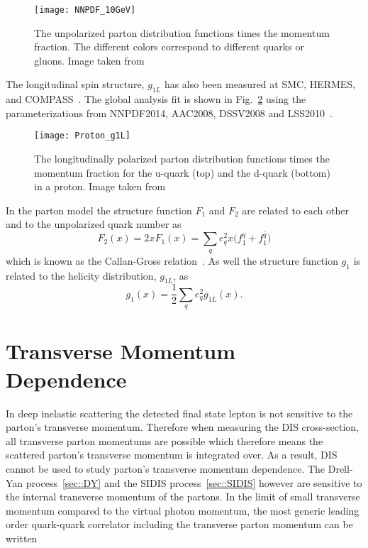 \begin{figure}[h!t]
  \centering \texttt{[image: NNPDF\_10GeV]}
  \caption{The unpolarized parton distribution functions times the momentum
    fraction.  The different colors correspond to different quarks or gluons.
    Image taken from~\cite{Tanabashi:2018oca}}
  \label{fig::NNPDF_10GeV}
\end{figure}

The longitudinal spin structure, $g_{1L}$ has also been measured at SMC, HERMES,
and COMPASS~\cite{Adeva:1997is,PhysRevLett.92.012005,Savin:2011zz}.  The global
analysis fit is shown in Fig.~\ref{fig::Proton_g1L} using the parameterizations
from NNPDF2014, AAC2008, DSSV2008 and
LSS2010~\cite{Harland-Lang:2016yfn,Abt:2016vjh,Nocera:2014gqa,Hirai:2008aj}.

\begin{figure}[h!t]
  \centering \texttt{[image: Proton\_g1L]}
  \caption{The longitudinally polarized parton distribution functions times the
    momentum fraction for the u-quark (top) and the d-quark (bottom) in a
    proton.  Image taken from~\cite{Tanabashi:2018oca}}
  \label{fig::Proton_g1L}
\end{figure}

In the parton model the structure function $F_1$ and $F_2$ are related to each
other and to the unpolarized quark number as
\begin{equation}
  F_2(x) = 2xF_1(x) = \sum_q e_q^2x\Big(f^q_1 + f^{\bar{q}}_1 \Big)
\end{equation}
which is known as the Callan-Gross relation~\cite{PhysRevLett.22.156}.  As well
the structure function $g_1$ is related to the helicity distribution, $g_{1L}$,
as
\begin{equation}
  g_1(x) = \frac{1}{2} \sum_q e^2_q g_{1L}(x).
  \label{equ::g1_g1l_relation}
\end{equation}


\section{Transverse Momentum Dependence}
In deep inelastic scattering the detected final state lepton is not sensitive to
the parton's transverse momentum.  Therefore when measuring the DIS
cross-section, all transverse parton momentums are possible which therefore
means the scattered parton's transverse momentum is integrated over.  As a
result, DIS cannot be used to study parton's transverse momentum dependence.
The Drell-Yan process~\ref{sec::DY} and the SIDIS process~\ref{sec::SIDIS}
however are sensitive to the internal transverse momentum of the partons.  In
the limit of small transverse momentum compared to the virtual photon momentum,
the most generic leading order quark-quark correlator including the transverse
parton momentum can be
written~\cite{Mulders:1995dh,Boer:1997nt,Bacchetta:2006tn}

